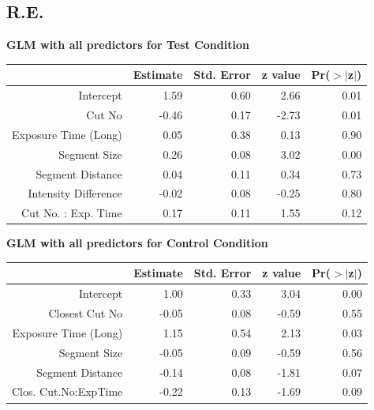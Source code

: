 \documentclass{article}
\begin{document}
\subsection*{R.E.}
\textbf{GLM with all predictors for Test Condition}
\begin{table}[ht]
\centering
\begin{tabular}{rrrrr}
  \hline
 & Estimate & Std. Error & z value & Pr($>$$|$z$|$) \\ 
  \hline
Intercept & 1.59 & 0.60 & 2.66 & 0.01 \\ 
  Cut No & -0.46 & 0.17 & -2.73 & 0.01 \\ 
  Exposure Time (Long) & 0.05 & 0.38 & 0.13 & 0.90 \\ 
  Segment Size & 0.26 & 0.08 & 3.02 & 0.00 \\ 
  Segment Distance & 0.04 & 0.11 & 0.34 & 0.73 \\ 
  Intensity Difference & -0.02 & 0.08 & -0.25 & 0.80 \\ 
  Cut No. : Exp. Time & 0.17 & 0.11 & 1.55 & 0.12 \\ 
   \hline
\end{tabular}
\end{table}

\textbf{GLM with all predictors for Control Condition}
\begin{table}[ht]
\centering
\begin{tabular}{rrrrr}
  \hline
 & Estimate & Std. Error & z value & Pr($>$$|$z$|$) \\ 
  \hline
Intercept & 1.00 & 0.33 & 3.04 & 0.00 \\ 
  Closest Cut No & -0.05 & 0.08 & -0.59 & 0.55 \\ 
  Exposure Time (Long) & 1.15 & 0.54 & 2.13 & 0.03 \\ 
  Segment Size & -0.05 & 0.09 & -0.59 & 0.56 \\ 
  Segment Distance & -0.14 & 0.08 & -1.81 & 0.07 \\ 
  Clos. Cut.No:ExpTime & -0.22 & 0.13 & -1.69 & 0.09 \\ 
   \hline
\end{tabular}
\end{table}
\clearpage
\end{document}
